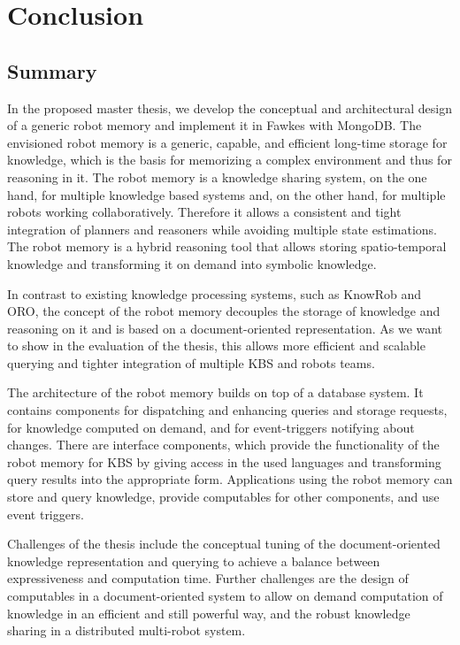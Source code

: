 \chapter{Conclusion}
\label{sec:conclusion}
\section{Summary}
\label{sec:summary}
In the proposed master thesis, we develop the conceptual and
architectural design of a generic robot memory and implement it in
Fawkes with MongoDB. The envisioned robot memory is a generic,
capable, and efficient long-time storage for knowledge, which is the
basis for memorizing a complex environment and thus for reasoning in
it. The robot memory is a knowledge sharing system, on the one hand,
for multiple knowledge based systems and, on the other hand, for
multiple robots working collaboratively. Therefore it allows a
consistent and tight integration of planners and reasoners while
avoiding multiple state estimations. The robot memory is a hybrid
reasoning tool that allows storing spatio-temporal knowledge and
transforming it on demand into symbolic knowledge.

In contrast to existing knowledge processing systems, such as KnowRob
and ORO, the concept of the robot memory decouples the storage of
knowledge and reasoning on it and is based on a document-oriented
representation. As we want to show in the evaluation of the thesis,
this allows more efficient and scalable querying and tighter
integration of multiple KBS and robots teams.

The architecture of the robot memory builds on top of a database
system. It contains components for dispatching and enhancing queries
and storage requests, for knowledge computed on demand, and for
event-triggers notifying about changes. There are interface
components, which provide the functionality of the robot memory for
KBS by giving access in the used languages and transforming query
results into the appropriate form. Applications using the robot memory
can store and query knowledge, provide computables for other
components, and use event triggers.

Challenges of the thesis include the conceptual tuning of the
document-oriented knowledge representation and querying to achieve a
balance between expressiveness and computation time. Further
challenges are the design of computables in a document-oriented system
to allow on demand computation of knowledge in an efficient and still
powerful way, and the robust knowledge sharing in a distributed
multi-robot system.

